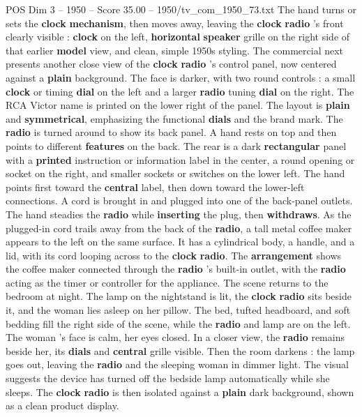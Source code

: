 \begin{textsample}{POS Dim 3 – 1950 – Score 35.00 – 1950/tv\_com\_1950\_73.txt}
The hand turns or sets the \textbf{clock} \textbf{mechanism}, then moves away, leaving the \textbf{clock} \textbf{radio} ’s front clearly visible : \textbf{clock} on the left, \textbf{horizontal} \textbf{speaker} grille on the right side of that earlier \textbf{model} view, and clean, simple 1950s styling.
The commercial next presents another close view of the \textbf{clock} \textbf{radio} ’s control panel, now centered against a \textbf{plain} background.
The face is darker, with two round controls : a small \textbf{clock} or timing \textbf{dial} on the left and a larger \textbf{radio} tuning \textbf{dial} on the right.
The RCA Victor name is printed on the lower right of the panel.
The layout is \textbf{plain} and \textbf{symmetrical}, emphasizing the functional \textbf{dials} and the brand mark.
The \textbf{radio} is turned around to show its back panel.
A hand rests on top and then points to different \textbf{features} on the back.
The rear is a dark \textbf{rectangular} panel with a \textbf{printed} instruction or information label in the center, a round opening or socket on the right, and smaller sockets or switches on the lower left.
The hand points first toward the \textbf{central} label, then down toward the lower-left connections.
A cord is brought in and plugged into one of the back-panel outlets.
The hand steadies the \textbf{radio} while \textbf{inserting} the plug, then \textbf{withdraws}.
As the plugged-in cord trails away from the back of the \textbf{radio}, a tall metal coffee maker appears to the left on the same surface.
It has a cylindrical body, a handle, and a lid, with its cord looping across to the \textbf{clock} \textbf{radio}.
The \textbf{arrangement} shows the coffee maker connected through the \textbf{radio} ’s built-in outlet, with the \textbf{radio} acting as the timer or controller for the appliance.
The scene returns to the bedroom at night.
The lamp on the nightstand is lit, the \textbf{clock} \textbf{radio} sits beside it, and the woman lies asleep on her pillow.
The bed, tufted headboard, and soft bedding fill the right side of the scene, while the \textbf{radio} and lamp are on the left.
The woman ’s face is calm, her eyes closed.
In a closer view, the \textbf{radio} remains beside her, its \textbf{dials} and \textbf{central} grille visible.
Then the room darkens : the lamp goes out, leaving the \textbf{radio} and the sleeping woman in dimmer light.
The visual suggests the device has turned off the bedside lamp automatically while she sleeps.
The \textbf{clock} \textbf{radio} is then isolated against a \textbf{plain} dark background, shown as a clean product display.

\end{textsample}

